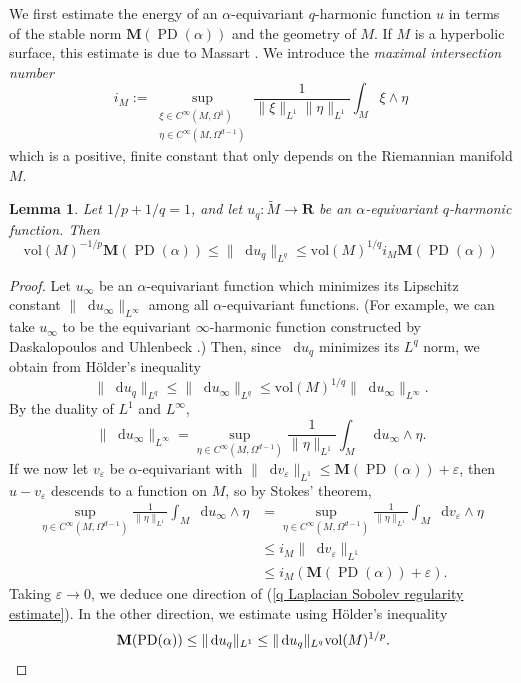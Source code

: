 \documentclass[reqno,11pt]{amsart}
\newcommand{\RR}{\mathbf{R}}
\newcommand*\dif{\mathop{}\!\mathrm{d}}
\DeclareMathOperator{\PD}{PD}
\newcommand{\vol}{\mathrm{vol}}
\newcommand{\Mass}{\mathbf M}
\newcommand{\dfn}[1]{\emph{#1}\index{#1}}
\newtheorem{lemma}[theorem]{Lemma}
\theoremstyle{definition}
\numberwithin{equation}{section}
\begin{document}
We first estimate the energy of an $\alpha$-equivariant $q$-harmonic function $u$ in terms of the stable norm $\Mass(\PD(\alpha))$ and the geometry of $M$.
If $M$ is a hyperbolic surface, this estimate is due to Massart \cite[\S4.2]{Massart96}.
We introduce the \dfn{maximal intersection number}
$$i_M := \sup_{\substack{\xi \in C^\infty(M, \Omega^1) \\ \eta \in C^\infty(M, \Omega^{d - 1})}} \frac{1}{\|\xi\|_{L^1} \|\eta\|_{L^1}} \int_M \xi \wedge \eta$$
which is a positive, finite constant that only depends on the Riemannian manifold $M$.

\begin{lemma}
Let $1/p + 1/q = 1$, and let $u_q: \tilde M \to \RR$ be an $\alpha$-equivariant $q$-harmonic function.
Then
\begin{equation}\label{q Laplacian Sobolev regularity estimate}
\vol(M)^{-1/p} \Mass(\PD(\alpha)) \leq \|\dif u_q\|_{L^q} \leq \vol(M)^{1/q} i_M \Mass(\PD(\alpha))
\end{equation}
\end{lemma}
\begin{proof}
Let $u_\infty$ be an $\alpha$-equivariant function which minimizes its Lipschitz constant $\|\dif u_\infty\|_{L^\infty}$ among all $\alpha$-equivariant functions. (For example, we can take $u_\infty$ to be the equivariant $\infty$-harmonic function constructed by Daskalopoulos and Uhlenbeck \cite[\S2]{daskalopoulos2020transverse}.)
Then, since $\dif u_q$ minimizes its $L^q$ norm, we obtain from H\"older's inequality
$$\|\dif u_q\|_{L^q} \leq \|\dif u_\infty\|_{L^q} \leq \vol(M)^{1/q} \|\dif u_\infty\|_{L^\infty}.$$
By the duality of $L^1$ and $L^\infty$,
$$\|\dif u_\infty\|_{L^\infty} = \sup_{\eta \in C^\infty(M, \Omega^{d - 1})} \frac{1}{\|\eta\|_{L^1}} \int_M \dif u_\infty \wedge \eta.$$
If we now let $v_\varepsilon$ be $\alpha$-equivariant with $\|\dif v_\varepsilon\|_{L^1} \leq \Mass(\PD(\alpha)) + \varepsilon$, then $u - v_\varepsilon$ descends to a function on $M$, so by Stokes' theorem,
\begin{align*}
\sup_{\eta \in C^\infty(M, \Omega^{d - 1})} \frac{1}{\|\eta\|_{L^1}} \int_M \dif u_\infty \wedge \eta 
&= \sup_{\eta \in C^\infty(M, \Omega^{d - 1})} \frac{1}{\|\eta\|_{L^1}} \int_M \dif v_\varepsilon \wedge \eta\\
&\leq i_M \|\dif v_\varepsilon\|_{L^1} \\
&\leq i_M(\Mass(\PD(\alpha)) + \varepsilon).
\end{align*}
Taking $\varepsilon \to 0$, we deduce one direction of (\ref{q Laplacian Sobolev regularity estimate}).
In the other direction, we estimate using H\"older's inequality
\begin{align*}
\Mass(\PD(\alpha)) &\leq \|\dif u_q\|_{L^1} \leq \|\dif u_q\|_{L^q} \vol(M)^{1/p}. \qedhere 
\end{align*}
\end{proof}
\end{document}
